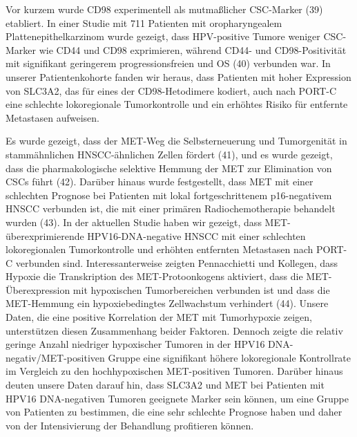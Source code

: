 Vor kurzem wurde CD98 experimentell als mutmaßlicher CSC-Marker (39) etabliert. In einer Studie mit 711 Patienten mit oropharyngealem Plattenepithelkarzinom wurde gezeigt, dass HPV-positive Tumore weniger CSC-Marker wie CD44 und CD98 exprimieren, während CD44- und CD98-Positivität mit signifikant geringerem progressionsfreien und OS (40) verbunden war. In unserer Patientenkohorte fanden wir heraus, dass Patienten mit hoher Expression von SLC3A2, das für eines der CD98-Hetodimere kodiert, auch nach PORT-C eine schlechte lokoregionale Tumorkontrolle und ein erhöhtes Risiko für entfernte Metastasen aufweisen.

Es wurde gezeigt, dass der MET-Weg die Selbsterneuerung und Tumorgenität in stammähnlichen HNSCC-ähnlichen Zellen fördert (41), und es wurde gezeigt, dass die pharmakologische selektive Hemmung der MET zur Elimination von CSCs führt (42). Darüber hinaus wurde festgestellt, dass MET mit einer schlechten Prognose bei Patienten mit lokal fortgeschrittenem p16-negativem HNSCC verbunden ist, die mit einer primären Radiochemotherapie behandelt wurden (43). In der aktuellen Studie haben wir gezeigt, dass MET-überexprimierende HPV16-DNA-negative HNSCC mit einer schlechten lokoregionalen Tumorkontrolle und erhöhten entfernten Metastasen nach PORT-C verbunden sind. Interessanterweise zeigten Pennacchietti und Kollegen, dass Hypoxie die Transkription des MET-Protoonkogens aktiviert, dass die MET-Überexpression mit hypoxischen Tumorbereichen verbunden ist und dass die MET-Hemmung ein hypoxiebedingtes Zellwachstum verhindert (44). Unsere Daten, die eine positive Korrelation der MET mit Tumorhypoxie zeigen, unterstützen diesen Zusammenhang beider Faktoren. Dennoch zeigte die relativ geringe Anzahl niedriger hypoxischer Tumoren in der HPV16 DNA-negativ/MET-positiven Gruppe eine signifikant höhere lokoregionale Kontrollrate im Vergleich zu den hochhypoxischen MET-positiven Tumoren. Darüber hinaus deuten unsere Daten darauf hin, dass SLC3A2 und MET bei Patienten mit HPV16 DNA-negativen Tumoren geeignete Marker sein können, um eine Gruppe von Patienten zu bestimmen, die eine sehr schlechte Prognose haben und daher von der Intensivierung der Behandlung profitieren können.

